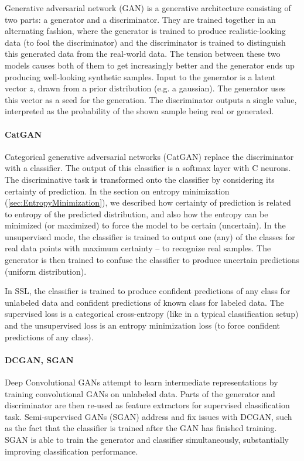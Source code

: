 Generative adversarial network (GAN) is a generative architecture consisting of two parts: a generator and a discriminator. They are trained together in an alternating fashion, where the generator is trained to produce realistic-looking data (to fool the discriminator) and the discriminator is trained to distinguish this generated data from the real-world data. The tension between these two models causes both of them to get increasingly better and the generator ends up producing well-looking synthetic samples. Input to the generator is a latent vector $z$, drawn from a prior distribution (e.g. a gaussian). The generator uses this vector as a seed for the generation. The discriminator outputs a single value, interpreted as the probability of the shown sample being real or generated.

\paragraph*{CatGAN}
Categorical generative adversarial networks (CatGAN) replace the discriminator with a classifier. The output of this classifier is a softmax layer with C neurons. The discriminative task is transformed onto the classifier by considering its certainty of prediction. In the section on entropy minimization (\ref{sec:EntropyMinimization}), we described how certainty of prediction is related to entropy of the predicted distribution, and also how the entropy can be minimized (or maximized) to force the model to be certain (uncertain). In the unsupervised mode, the classifier is trained to output one (any) of the classes for real data points with maximum certainty -- to recognize real samples. The generator is then trained to confuse the classifier to produce uncertain predictions (uniform distribution).

In SSL, the classifier is trained to produce confident predictions of any class for unlabeled data and confident predictions of known class for labeled data. The supervised loss is a categorical cross-entropy (like in a typical classification setup) and the unsupervised loss is an entropy minimization loss (to force confident predictions of any class).

\paragraph*{DCGAN, SGAN}
Deep Convolutional GANs attempt to learn intermediate representations by training convolutional GANs on unlabeled data. Parts of the generator and discriminator are then re-used as feature extractors for supervised classification task. Semi-supervised GANs (SGAN) address and fix issues with DCGAN, such as the fact that the classifier is trained after the GAN has finished training. SGAN is able to train the generator and classifier simultaneously, substantially improving classification performance.

